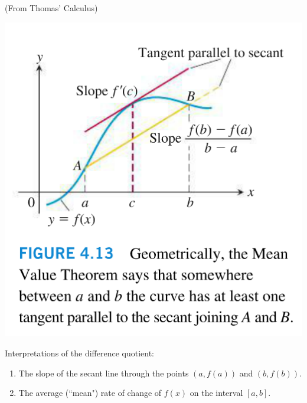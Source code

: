 \documentclass[12pt]{report}
\begin{document}
\begin{multicols}{2}

(From Thomas' Calculus) 

\includegraphics[scale=0.75]{MVTpic.png}


\vspace{1in}
Interpretations of the difference quotient: \\

\begin{enumerate}

\item The slope of the secant line through the points $(a, f(a))$ and $(b, f(b))$. \\

\item The average (``mean") rate of change of $f(x)$ on the interval $[a,b]$. \\

\end{enumerate}

\end{multicols}

\newpage
\fi
\end{document}
